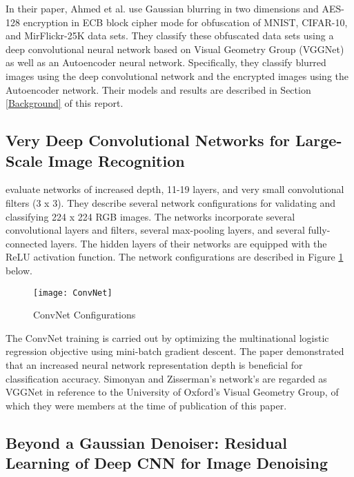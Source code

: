 \documentclass[12pt, titlepage]{article}
\begin{document}
\noindent In their paper, Ahmed et al. use Gaussian blurring in two dimensions and AES-128 encryption in ECB block cipher mode for obfuscation of MNIST, CIFAR-10, and MirFlickr-25K data sets. They classify these obfuscated data sets using a deep convolutional neural network based on \cite{simonyan2014very} Visual Geometry Group (VGGNet) as well as an Autoencoder neural network. Specifically, they classify blurred images using the deep convolutional network and the encrypted images using the Autoencoder network. Their models and results are described in Section \ref{Background} of this report. \\
	
\subsection{Very Deep Convolutional Networks for Large-Scale Image Recognition}
	
\noindent \cite{simonyan2014very} evaluate networks of increased depth, 11-19 layers, and very small convolutional filters (3 x 3). They describe several network configurations for validating and classifying 224 x 224 RGB images. The networks incorporate several convolutional layers and filters, several max-pooling layers, and several fully-connected layers. The hidden layers of their networks are equipped with the ReLU activation function. The network configurations are described in Figure \ref{ConvNet} below.
	
	\begin{figure}[h!]
		\begin{center}
			\texttt{[image: ConvNet]}
			\caption{ConvNet Configurations}
			\label{ConvNet}
		\end{center}
	\end{figure}
	
\noindent The ConvNet training is carried out by optimizing the multinational logistic regression objective using mini-batch gradient descent. The paper demonstrated that an increased neural network representation depth is beneficial for classification accuracy. Simonyan and Zisserman's network's are regarded as VGGNet in reference to the University of Oxford's Visual Geometry Group, of which they were members at the time of publication of this paper.\\ 
	
\subsection{Beyond a Gaussian Denoiser: Residual Learning of Deep CNN for Image Denoising}
\end{document}
